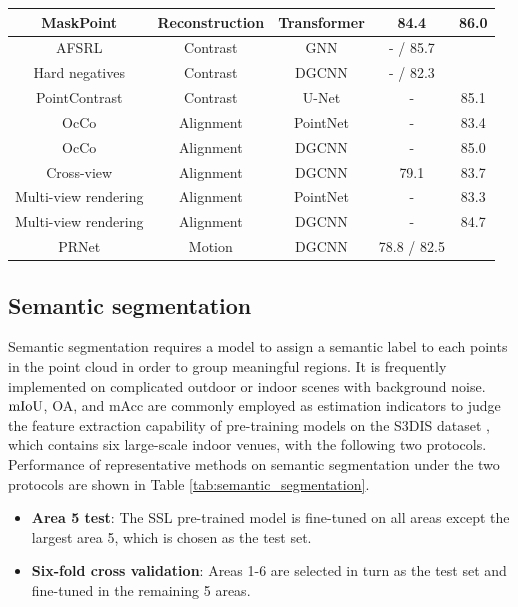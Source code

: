 \documentclass[a4paper,fleqn]{cas-dc}
\begin{document}
\begin{table}[]
{\begin{tabular}{*{5}{c}}
        MaskPoint \citep{liu2022masked} & Reconstruction & Transformer & 84.4 & 86.0 \\
        \midrule
        AFSRL \citep{lu2022joint} & Contrast & GNN & - / 85.7 \\
        Hard negatives \citep{du2021self} & Contrast & DGCNN & - / 82.3 \\
        PointContrast \citep{xie2020pointcontrast} & Contrast & U-Net & - & 85.1 \\
        \midrule
        OcCo \citep{wang2021unsupervised} & Alignment & PointNet & - & 83.4 \\
        OcCo \citep{wang2021unsupervised} & Alignment & DGCNN & - & 85.0 \\
        Cross-view \citep{jing2021self} & Alignment & DGCNN & 79.1 & 83.7 \\
        Multi-view rendering \citep{tran2022self} & Alignment & PointNet & - & 83.3 \\
        Multi-view rendering \citep{tran2022self} & Alignment & DGCNN & - & 84.7 \\
        \midrule
        PRNet \citep{wang2019prnet} & Motion & DGCNN & 78.8 / 82.5 \\
        \bottomrule
    \end{tabular}}
\end{table}   


\subsection{Semantic segmentation}
Semantic segmentation requires a model to assign a semantic label to each points in the point cloud in order to group meaningful regions. It is frequently implemented on complicated outdoor or indoor scenes with background noise. $\rm mIoU$, OA, and mAcc are commonly employed as estimation indicators to judge the feature extraction capability of pre-training models on the S3DIS dataset \citep{armeni20163d}, which contains six large-scale indoor venues, with the following two protocols. Performance of representative methods on semantic segmentation under the two protocols are shown in Table \ref{tab:semantic_segmentation}.


\begin{itemize}
    \item \textbf{Area 5 test}: The SSL pre-trained model is fine-tuned on all areas except the largest area 5, which is chosen as the test set.
    \item \textbf{Six-fold cross validation}: Areas 1-6 are selected in turn as the test set and fine-tuned in the remaining 5 areas.
\end{itemize}
\end{document}
